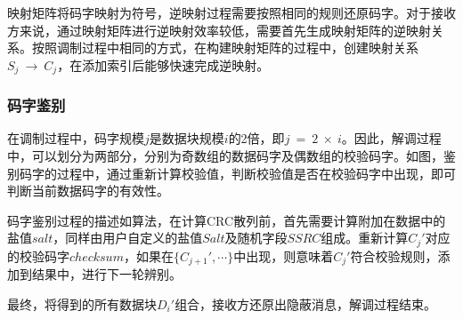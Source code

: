 映射矩阵将码字映射为符号，逆映射过程需要按照相同的规则还原码字。对于接收方来说，通过映射矩阵进行逆映射效率较低，需要首先生成映射矩阵的逆映射关系。按照调制过程中相同的方式，在构建映射矩阵的过程中，创建映射关系$S_{j}\ \rightarrow\ C_{j}$，在添加索引后能够快速完成逆映射。

\subsubsection{码字鉴别}
\label{chap:zigzag:model:demodulation:identification}


在调制过程中，码字规模$j$是数据块规模$i$的2倍，即$j\ =\ 2\ \times\ i$。因此，解调过程中，可以划分为两部分，分别为奇数组的数据码字及偶数组的校验码字。如图，鉴别码字的过程中，通过重新计算校验值，判断校验值是否在校验码字中出现，即可判断当前数据码字的有效性。

码字鉴别过程的描述如算法，在计算CRC散列前，首先需要计算附加在数据中的盐值$salt$，同样由用户自定义的盐值$Salt$及随机字段$SSRC$组成。重新计算$C_{j}'$对应的校验码字$checksum$，如果在$\{C_{j+1}',\cdots\}$中出现，则意味着$C_{j}'$符合校验规则，添加到结果中，进行下一轮辨别。

最终，将得到的所有数据块$D_{i}'$组合，接收方还原出隐蔽消息，解调过程结束。